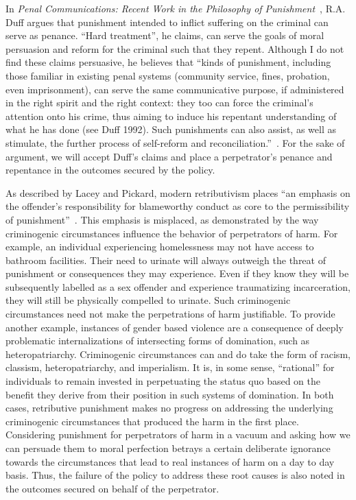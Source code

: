 \documentclass{article}
\begin{document}
        In \textit{Penal Communications: Recent Work in the Philosophy of Punishment}~\cite{communicative-retribution}, R.A. Duff argues that punishment intended to inflict suffering on the criminal can serve as penance. ``Hard treatment'', he claims, can serve the goals of moral persuasion and reform for the criminal such that they repent. Although I do not find these claims persuasive, he believes that ``kinds of punishment, including those familiar in existing penal systems (community service, fines, probation, even imprisonment), can serve the same communicative purpose, if administered in the right spirit and the right context: they too can force the criminal's attention onto his crime, thus aiming to induce his repentant understanding of what he has done (see Duff 1992). Such punishments can also assist, as well as stimulate, the further process of self-reform and reconciliation.''~\cite[p. 53]{communicative-retribution}. For the sake of argument, we will accept Duff's claims and place a perpetrator's penance and repentance in the outcomes secured by the policy. 

        As described by Lacey and Pickard, modern retributivism places ``an emphasis on the offender's responsibility for blameworthy conduct as core to the permissibility of punishment''~\cite{dual-process}. This emphasis is misplaced, as demonstrated by the way criminogenic circumstances influence the behavior of perpetrators of harm. For example, an individual experiencing homelessness may not have access to bathroom facilities. Their need to urinate will always outweigh the threat of punishment or consequences they may experience. Even if they know they will be subsequently labelled as a sex offender and experience traumatizing incarceration, they will still be physically compelled to urinate. Such criminogenic circumstances need not make the perpetrations of harm justifiable. To provide another example, instances of gender based violence are a consequence of deeply problematic internalizations of intersecting forms of domination, such as heteropatriarchy. Criminogenic circumstances can and do take the form of racism, classism, heteropatriarchy, and imperialism. It is, in some sense, ``rational'' for individuals to remain invested in perpetuating the status quo based on the benefit they derive from their position in such systems of domination. In both cases, retributive punishment makes no progress on addressing the underlying criminogenic circumstances that produced the harm in the first place. Considering punishment for perpetrators of harm in a vacuum and asking how we can persuade them to moral perfection betrays a certain deliberate ignorance towards the circumstances that lead to real instances of harm on a day to day basis. Thus, the failure of the policy to address these root causes is also noted in the outcomes secured on behalf of the perpetrator. 
\end{document}
